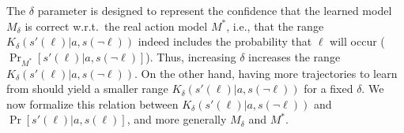 \documentclass[letterpaper]{article} %
\newcommand{\tuple}[1]{\ensuremath{\left \langle #1 \right \rangle }}
\begin{document}
The $\delta$ parameter is designed to represent the confidence that the learned model $M_\delta$ is correct w.r.t.\ the real action model $M^*$, i.e., that the range $K_\delta(s'(\ell)|a,s(\neg\ell))$ indeed includes the probability that $\ell$ will occur ($\Pr_{M^*}[s'(\ell)|a,s(\neg\ell)]$). 
Thus, increasing $\delta$ increases the range $K_\delta(s'(\ell)|a,s(\neg\ell))$. 
On the other hand, having more trajectories to learn from should yield a smaller range $K_\delta(s'(\ell)|a,s(\neg\ell))$ for a fixed $\delta$. %
We now formalize this relation between $K_\delta(s'(\ell)|a,s(\neg\ell))$ and $\Pr[s'(\ell)|a,s(\ell)]$, and more generally $M_\delta$ and $M^*$. 


\end{document}
